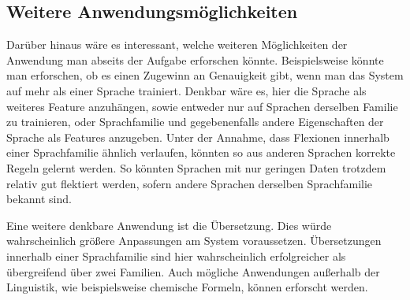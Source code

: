 \documentclass[a4paper]{article}
\begin{document}
\subsection{Weitere Anwendungsmöglichkeiten}

Darüber hinaus wäre es interessant, welche weiteren Möglichkeiten der Anwendung man abseits der Aufgabe erforschen könnte. Beispielsweise könnte man erforschen, ob es einen Zugewinn an Genauigkeit gibt, wenn man das System auf mehr als einer Sprache trainiert. Denkbar wäre es, hier die Sprache als weiteres Feature anzuhängen, sowie entweder nur auf Sprachen derselben Familie zu trainieren, oder Sprachfamilie und gegebenenfalls andere Eigenschaften der Sprache als Features anzugeben. Unter der Annahme, dass Flexionen innerhalb einer Sprachfamilie ähnlich verlaufen, könnten so aus anderen Sprachen korrekte Regeln gelernt werden.  So könnten Sprachen mit nur geringen Daten trotzdem relativ gut flektiert werden, sofern andere Sprachen derselben Sprachfamilie bekannt sind.

Eine weitere denkbare Anwendung ist die Übersetzung. Dies würde wahrscheinlich größere Anpassungen am System voraussetzen. Übersetzungen innerhalb einer Sprachfamilie sind hier wahrscheinlich erfolgreicher als übergreifend über zwei Familien. Auch mögliche Anwendungen außerhalb der Linguistik, wie beispielsweise chemische Formeln, können erforscht werden.




\appendix
\end{document}
